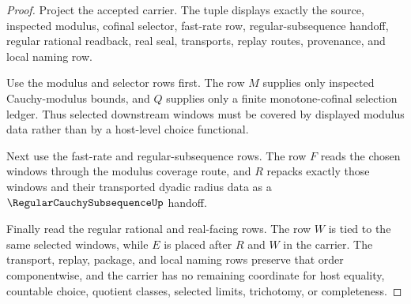 \begin{proof}
Project the accepted carrier. The tuple displays exactly the source, inspected modulus, cofinal selector, fast-rate row, regular-subsequence handoff, regular rational readback, real seal, transports, replay routes, provenance, and local naming row.

Use the modulus and selector rows first. The row $M$ supplies only inspected Cauchy-modulus bounds, and $Q$ supplies only a finite monotone-cofinal selection ledger. Thus selected downstream windows must be covered by displayed modulus data rather than by a host-level choice functional.

Next use the fast-rate and regular-subsequence rows. The row $F$ reads the chosen windows through the modulus coverage route, and $R$ repacks exactly those windows and their transported dyadic radius data as a $\RegularCauchySubsequenceUp$ handoff.

Finally read the regular rational and real-facing rows. The row $W$ is tied to the same selected windows, while $E$ is placed after $R$ and $W$ in the carrier. The transport, replay, package, and local naming rows preserve that order componentwise, and the carrier has no remaining coordinate for host equality, countable choice, quotient classes, selected limits, trichotomy, or completeness.
\end{proof}


